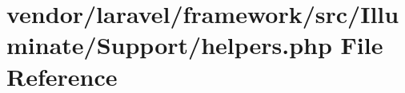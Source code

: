 \section{vendor/laravel/framework/src/\+Illuminate/\+Support/helpers.php File Reference}
\label{laravel_2framework_2src_2_illuminate_2_support_2helpers_8php}
